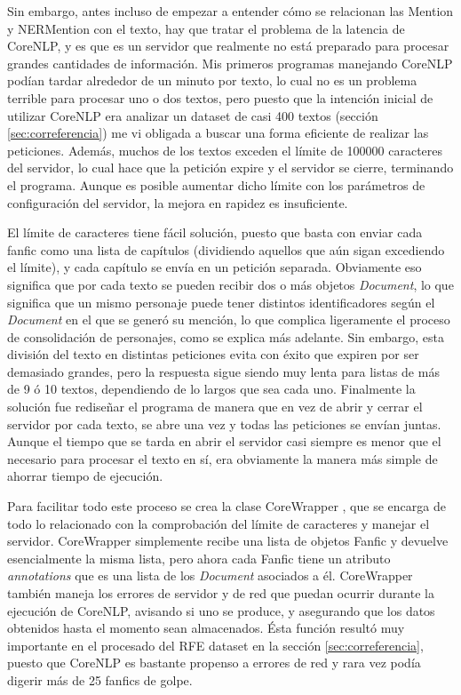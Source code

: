 \documentclass{pre-tfg}
\begin{document}
Sin embargo, antes incluso de empezar a entender cómo se relacionan las Mention y NERMention con el texto, hay que tratar el problema de la latencia de CoreNLP, y es que es un servidor que realmente no está preparado para procesar grandes cantidades de información. Mis primeros programas manejando CoreNLP podían tardar alrededor de un minuto por texto, lo cual no es un problema terrible para procesar uno o dos textos, pero puesto que la intención inicial de utilizar CoreNLP era analizar un dataset de casi 400 textos (sección \ref{sec:correferencia}) me vi obligada a buscar una forma eficiente de realizar las peticiones. Además, muchos de los textos exceden el límite de 100000 caracteres del servidor, lo cual hace que la petición expire y el servidor se cierre, terminando el programa. Aunque es posible aumentar dicho límite con los parámetros de configuración del servidor, la mejora en rapidez es insuficiente.

El límite de caracteres tiene fácil solución, puesto que basta con enviar cada fanfic como una lista de capítulos \label{nota:limiteCarac} (dividiendo aquellos que aún sigan excediendo el límite), y cada capítulo se envía en un petición separada. Obviamente eso significa que por cada texto se pueden recibir dos o más objetos \textit{Document}, lo que significa que un mismo personaje puede tener distintos identificadores según el \textit{Document} en el que se generó su mención, lo que complica ligeramente el proceso de consolidación de personajes, como se explica más adelante. Sin embargo, esta división del texto en distintas peticiones evita con éxito que expiren por ser demasiado grandes, pero la respuesta sigue siendo muy lenta para listas de más de 9 ó 10 textos, dependiendo de lo largos que sea cada uno.
Finalmente la solución fue rediseñar el programa de manera que en vez de abrir y cerrar el servidor por cada texto, se abre una vez y todas las peticiones se envían juntas. Aunque el tiempo que se tarda en abrir el servidor casi siempre es menor que el necesario para procesar el texto en sí, era obviamente la manera más simple de ahorrar tiempo de ejecución.

Para facilitar todo este proceso se crea la clase CoreWrapper , que se encarga de todo lo relacionado con la comprobación del límite de caracteres y manejar el servidor. CoreWrapper simplemente recibe una lista de objetos Fanfic y devuelve esencialmente la misma lista, pero ahora cada Fanfic tiene un atributo \textit{annotations} que es una lista de los \textit{Document} asociados a él.
CoreWrapper también maneja los errores de servidor y de red que puedan ocurrir durante la ejecución de CoreNLP, avisando si uno se produce, y asegurando que los datos obtenidos hasta el momento sean almacenados. Ésta función resultó muy importante en el procesado del RFE dataset en la sección \ref{sec:correferencia}, puesto que CoreNLP es bastante propenso a errores de red y rara vez podía digerir más de 25 fanfics de golpe. 
\end{document}
